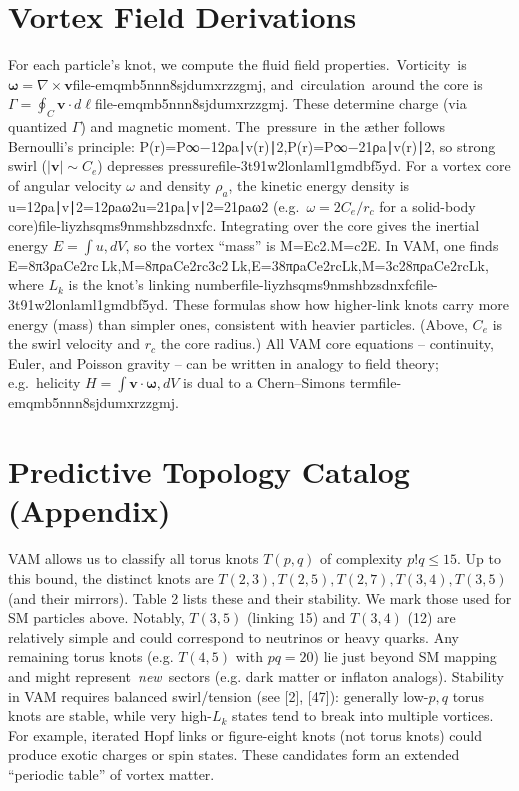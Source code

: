 \documentclass[a4paper,12pt]{article}
\begin{document}
\section*{Vortex Field Derivations}
For each particle’s knot, we compute the fluid field properties. Vorticity is $\boldsymbol{\omega}=\nabla\times\mathbf{v}$file-emqmb5nnn8sjdumxrzzgmj, and circulation around the core is $\Gamma=\oint_C\mathbf{v}\cdot d\boldsymbol{\ell}$file-emqmb5nnn8sjdumxrzzgmj. These determine charge (via quantized $\Gamma$) and magnetic moment. The pressure in the æther follows Bernoulli’s principle:
P(r)=P∞−12ρa∣v(r)∣2,P(r)=P∞​−21​ρa​∣v(r)∣2,
so strong swirl ($|\mathbf{v}|\sim C_e$) depresses pressurefile-3t91w2lonlaml1gmdbf5yd. For a vortex core of angular velocity $\omega$ and density $\rho_a$, the kinetic energy density is
u=12ρa∣v∣2=12ρaω2u=21​ρa​∣v∣2=21​ρa​ω2
(e.g.\ $\omega = 2C_e/r_c$ for a solid-body core)file-liyzhsqms9nmshbzsdnxfc. Integrating over the core gives the inertial energy $E=\int u,dV$, so the vortex “mass” is
M=Ec2.M=c2E​.
In VAM, one finds
E=8π3ρaCe2rc Lk,M=8πρaCe2rc3c2 Lk,E=38π​ρa​Ce2​rc​Lk​,M=3c28πρa​Ce2​rc​​Lk​,
where $L_k$ is the knot’s linking numberfile-liyzhsqms9nmshbzsdnxfcfile-3t91w2lonlaml1gmdbf5yd. These formulas show how higher-link knots carry more energy (mass) than simpler ones, consistent with heavier particles. (Above, $C_e$ is the swirl velocity and $r_c$ the core radius.) All VAM core equations – continuity, Euler, and Poisson gravity – can be written in analogy to field theory; e.g.\ helicity $H=\int \mathbf{v}\cdot\boldsymbol{\omega},dV$ is dual to a Chern–Simons termfile-emqmb5nnn8sjdumxrzzgmj.

\section*{Predictive Topology Catalog (Appendix)}
VAM allows us to classify all torus knots $T(p,q)$ of complexity $p!q\le15$. Up to this bound, the distinct knots are $T(2,3),T(2,5),T(2,7),T(3,4),T(3,5)$ (and their mirrors). Table 2 lists these and their stability. We mark those used for SM particles above. Notably, $T(3,5)$ (linking 15) and $T(3,4)$ (12) are relatively simple and could correspond to neutrinos or heavy quarks. Any remaining torus knots (e.g. $T(4,5)$ with $pq=20$) lie just beyond SM mapping and might represent \textit{new} sectors (e.g. dark matter or inflaton analogs). Stability in VAM requires balanced swirl/tension (see [2], [47]): generally low-$p,q$ torus knots are stable, while very high-$L_k$ states tend to break into multiple vortices. For example, iterated Hopf links or figure-eight knots (not torus knots) could produce exotic charges or spin states. These candidates form an extended “periodic table” of vortex matter.
\end{document}

